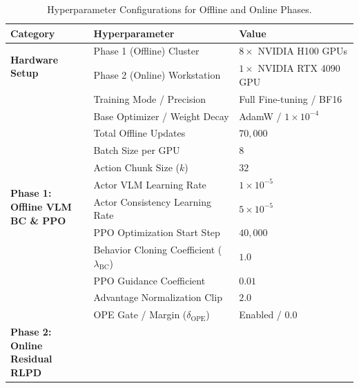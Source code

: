 \documentclass{article}
\begin{document}
\begin{table}[htbp]
\centering
\caption{Hyperparameter Configurations for Offline and Online Phases.}
\label{tab:hyperparameters}
\footnotesize
\begin{tabularx}{\textwidth}{@{}l l X@{}}
\toprule
\textbf{Category} & \textbf{Hyperparameter} & \textbf{Value} \\
\midrule
\multirow{2}{*}{\parbox{2.5cm}{\textbf{Hardware Setup}}} 
& Phase 1 (Offline) Cluster & $8\times$ NVIDIA H100 GPUs \\
& Phase 2 (Online) Workstation & $1\times$ NVIDIA RTX 4090 GPU \\
\midrule
\multirow{12}{*}{\parbox{2.5cm}{\textbf{Phase 1:\\Offline VLM\\BC \& PPO}}} 
& Training Mode / Precision & Full Fine-tuning / BF16 \\
& Base Optimizer / Weight Decay & AdamW / $1 \times 10^{-4}$ \\
& Total Offline Updates & $70,000$ \\
& Batch Size per GPU & $8$ \\
& Action Chunk Size ($k$) & $32$ \\
& Actor VLM Learning Rate & $1 \times 10^{-5}$ \\
& Actor Consistency Learning Rate & $5 \times 10^{-5}$ \\
& PPO Optimization Start Step & $40,000$ \\
& Behavior Cloning Coefficient ($\lambda_{\text{BC}}$) & $1.0$ \\
& PPO Guidance Coefficient & $0.01$ \\
& Advantage Normalization Clip & $2.0$ \\
& OPE Gate / Margin ($\delta_{\text{OPE}}$) & Enabled / $0.0$ \\
\midrule
\multirow{15}{*}{\parbox{2.5cm}{\textbf{Phase 2:\\Online Residual\\RLPD}}} 

\end{tabularx}
\end{table}
\end{document}
